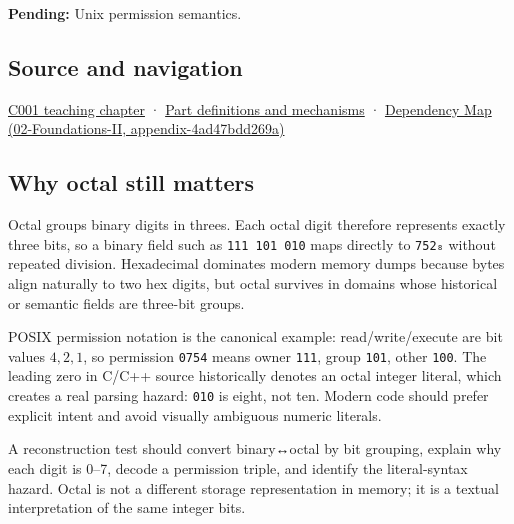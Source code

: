 \textbf{Pending:} Unix permission semantics.

\subsection{Source and navigation}\label{appendix-17fc1bc8b305-source-and-navigation}

\hyperref[01-foundations-i-ch001-from-a-signal-to-an-interpretation]{C001 teaching chapter} · \hyperref[appendix-fd090d982a15]{Part definitions and mechanisms} · \href{../02-Foundations-II/main.pdf\#nameddest=appendix-4ad47bdd269a}{Dependency Map (02-Foundations-II, appendix-4ad47bdd269a)}

\subsection{Why octal still matters}\label{appendix-17fc1bc8b305-why-octal-still-matters}

Octal groups binary digits in threes. Each octal digit therefore represents exactly three bits, so a binary field such as \texttt{111\ 101\ 010} maps directly to \texttt{752₈} without repeated division. Hexadecimal dominates modern memory dumps because bytes align naturally to two hex digits, but octal survives in domains whose historical or semantic fields are three-bit groups.

POSIX permission notation is the canonical example: read/write/execute are bit values \(4,2,1\), so permission \texttt{0754} means owner \texttt{111}, group \texttt{101}, other \texttt{100}. The leading zero in C/C++ source historically denotes an octal integer literal, which creates a real parsing hazard: \texttt{010} is eight, not ten. Modern code should prefer explicit intent and avoid visually ambiguous numeric literals.

A reconstruction test should convert binary↔octal by bit grouping, explain why each digit is 0--7, decode a permission triple, and identify the literal-syntax hazard. Octal is not a different storage representation in memory; it is a textual interpretation of the same integer bits.
